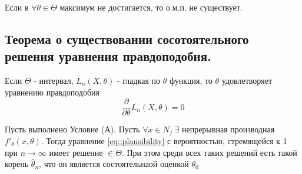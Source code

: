 Если в \(\forall\theta\in\Theta\) максимум не достигается, то о.м.п. не существует.

\subsection{Теорема о существовании сосотоятельного решения уравнения правдоподобия.}

Если \(\Theta\) - интервал, \(L_n(X, \theta)\) - гладкая по \(\theta\) функция,
то \(\theta\) удовлетворяет уравнению правдоподобия
\begin{equation} \label{eq::plausibility}
    \frac{\partial}{\partial\theta}L_n(X, \theta) = 0
\end{equation}
\begin{theorem}
    \label{th::consist_plausibility}
    Пусть выполнено Условие (А). Пусть \(\forall x \in N_f \ \exists\) непрерывная
    производная \(f'_{\theta}(x, \theta)\). Тогда уравнение \eqref{eq::plausibility}
    с вероятностью, стремящейся к 1 при \(n\rightarrow \infty\) имеет решение \(\in\Theta\).
    При этом среди всех таких решений есть такой корень \(\widehat{\theta}_n\), что он
    является состоятельнаой оценкой \(\theta_0\)
\end{theorem}
